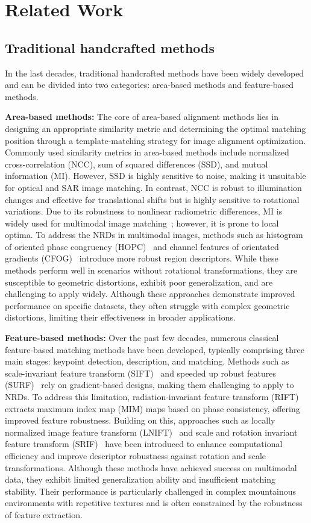 \section{Related Work}
\label{2}
\subsection{Traditional handcrafted methods}
In the last decades, traditional handcrafted methods have been widely developed and can be divided into two categories: area-based methods and feature-based methods.

{\bf{Area-based methods:}} The core of area-based alignment methods lies in designing an appropriate similarity metric and determining the optimal matching position through a template-matching strategy for image alignment optimization. Commonly used similarity metrics in area-based methods include normalized cross-correlation (NCC), sum of squared differences (SSD), and mutual information (MI). However, SSD is highly sensitive to noise, making it unsuitable for optical and SAR image matching. In contrast, NCC is robust to illumination changes and effective for translational shifts but is highly sensitive to rotational variations. Due to its robustness to nonlinear radiometric differences, MI is widely used for multimodal image matching~\cite{OFVERSTEDT2022196}; however, it is prone to local optima. To address the NRDs in multimodal images, methods such as histogram of oriented phase congruency (HOPC)~\cite{ye2017robust} and channel features of orientated gradients (CFOG)~\cite{ye2019fast} introduce more robust region descriptors. While these methods perform well in scenarios without rotational transformations, they are susceptible to geometric distortions, exhibit poor generalization, and are challenging to apply widely. Although these approaches demonstrate improved performance on specific datasets, they often struggle with complex geometric distortions, limiting their effectiveness in broader applications.


{\bf{Feature-based methods:}} 
Over the past few decades, numerous classical feature-based matching methods have been developed, typically comprising three main stages: keypoint detection, description, and matching. Methods such as scale-invariant feature transform (SIFT)~\cite{lowe2004distinctive} and speeded up robust features (SURF)~\cite{bay2008speeded} rely on gradient-based designs, making them challenging to apply to NRDs. To address this limitation, radiation-invariant feature transform (RIFT)~\cite{8935498} extracts maximum index map (MIM) maps based on phase consistency, offering improved feature robustness. Building on this, approaches such as locally normalized image feature transform (LNIFT)~\cite{li2022lnift} and scale and rotation invariant feature transform (SRIF)~\cite{li2023multimodal} have been introduced to enhance computational efficiency and improve descriptor robustness against rotation and scale transformations. Although these methods have achieved success on multimodal data, they exhibit limited generalization ability and insufficient matching stability. Their performance is particularly challenged in complex mountainous environments with repetitive textures and is often constrained by the robustness of feature extraction.


